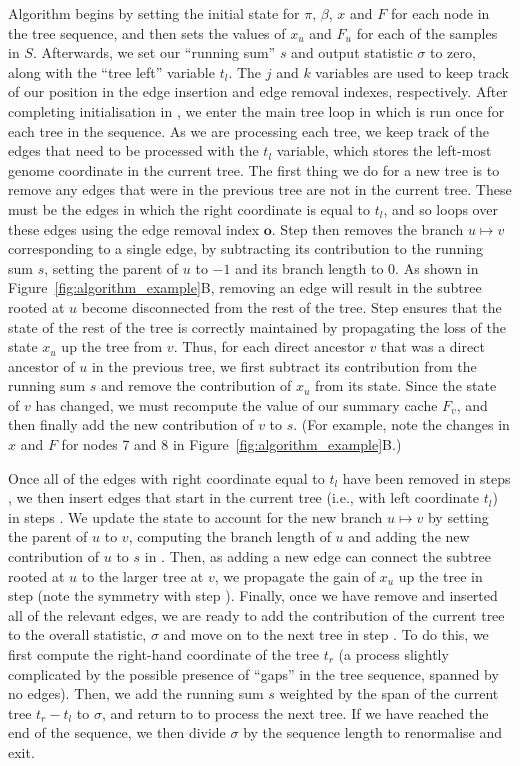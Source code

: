 \documentclass{article}
\newcommand{\indexout}[0]{\ensuremath{\mathbf{o}}}
\begin{document}
Algorithm  begins by setting the initial state for $\pi$, $\beta$,
$x$ and $F$ for each node in the tree sequence, and then sets the values
of $x_u$ and $F_u$ for each of the samples in $S$. Afterwards, we set
our ``running sum'' $s$ and output statistic $\sigma$ to zero, along
with the ``tree left'' variable $t_l$. The $j$ and $k$ variables are
used to keep track of our position in the edge insertion and edge
removal indexes, respectively. After completing initialisation in
, we enter the main tree loop in  which is
run once for each tree in the sequence. As we are processing each
tree, we keep track of the edges that need to be processed with
the $t_l$ variable, which stores the left-most genome coordinate
in the current tree. The first thing we do for a new tree is to
remove any edges that were in the previous tree are not in the
current tree. These must be the edges in which the right coordinate
is equal to $t_l$, and so  loops over these edges using
the edge removal index $\indexout$. Step  then removes
the branch $u \mapsto v$ corresponding to a single edge, by
subtracting its contribution to the running sum $s$, setting the parent of
$u$ to $-1$ and its branch length to $0$. As shown in
Figure~\ref{fig:algorithm_example}B, removing an edge will result
in the subtree rooted at $u$ become disconnected from the rest of the
tree. Step  ensures that the state of the rest of the tree
is correctly maintained by propagating the loss of the state $x_u$
up the tree from $v$. Thus, for each direct ancestor $v$ that was a
direct ancestor of $u$ in the previous tree, we first subtract
its contribution from the running sum $s$ and remove the contribution
of $x_u$ from its state. Since the state of $v$ has changed, we must
recompute the value of our summary cache $F_v$, and then finally
add the new contribution of $v$ to $s$. (For example, note the changes in $x$
and $F$ for nodes 7 and 8 in Figure~\ref{fig:algorithm_example}B.)

Once all of the edges with right coordinate equal to $t_l$ have been removed in
steps , we then insert edges that start in the current tree
(i.e., with left coordinate $t_l$) in steps . We update the
state to account for the new branch $u \mapsto v$ by setting the parent of
$u$ to $v$, computing the branch length of $u$ and adding the new contribution
of $u$ to $s$ in . Then, as adding a new edge can connect the
subtree rooted at $u$ to the larger tree at $v$, we propagate the gain of $x_u$
up the tree in step  (note the symmetry with step ).
Finally, once we have remove and inserted all of the relevant edges, we are
ready to add the contribution of the current tree to the overall statistic,
$\sigma$ and move on to the next tree in step . To do this, we first
compute the right-hand coordinate of the tree $t_r$ (a process slightly
complicated by the possible presence of ``gaps'' in the tree sequence, spanned
by no edges). Then, we add the running sum $s$ weighted by the span of the
current tree $t_r - t_l$ to $\sigma$, and return to  to process the
next tree. If we have reached the end of the sequence, we then divide $\sigma$
by the sequence length to renormalise and exit.
\end{document}
